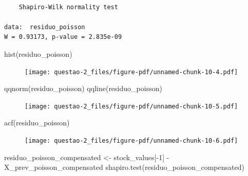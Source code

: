 \documentclass[
  letterpaper,
  DIV=11,
  numbers=noendperiod]{scrreprt}
\newenvironment{Shaded}{\begin{snugshade}}{\end{snugshade}}
\newcommand{\DecValTok}[1]{\textcolor[rgb]{0.68,0.00,0.00}{#1}}
\newcommand{\FunctionTok}[1]{\textcolor[rgb]{0.28,0.35,0.67}{#1}}
\newcommand{\NormalTok}[1]{\textcolor[rgb]{0.00,0.23,0.31}{#1}}
\newcommand{\OtherTok}[1]{\textcolor[rgb]{0.00,0.23,0.31}{#1}}
\newcommand{\SpecialCharTok}[1]{\textcolor[rgb]{0.37,0.37,0.37}{#1}}
\begin{document}
\begin{verbatim}

    Shapiro-Wilk normality test

data:  residuo_poisson
W = 0.93173, p-value = 2.835e-09
\end{verbatim}

\begin{Shaded}
\begin{Highlighting}[]
\FunctionTok{hist}\NormalTok{(residuo\_poisson)}
\end{Highlighting}
\end{Shaded}

\begin{figure}[H]

{\centering \texttt{[image: questao-2\_files/figure-pdf/unnamed-chunk-10-4.pdf]}

}

\end{figure}

\begin{Shaded}
\begin{Highlighting}[]
\FunctionTok{qqnorm}\NormalTok{(residuo\_poisson)}
\FunctionTok{qqline}\NormalTok{(residuo\_poisson)}
\end{Highlighting}
\end{Shaded}

\begin{figure}[H]

{\centering \texttt{[image: questao-2\_files/figure-pdf/unnamed-chunk-10-5.pdf]}

}

\end{figure}

\begin{Shaded}
\begin{Highlighting}[]
\FunctionTok{acf}\NormalTok{(residuo\_poisson)}
\end{Highlighting}
\end{Shaded}

\begin{figure}[H]

{\centering \texttt{[image: questao-2\_files/figure-pdf/unnamed-chunk-10-6.pdf]}

}

\end{figure}

\begin{Shaded}
\begin{Highlighting}[]
\NormalTok{residuo\_poisson\_compensated }\OtherTok{\textless{}{-}}\NormalTok{ stock\_values[}\SpecialCharTok{{-}}\DecValTok{1}\NormalTok{] }\SpecialCharTok{{-}}\NormalTok{ X\_prev\_poisson\_compensated}
\FunctionTok{shapiro.test}\NormalTok{(residuo\_poisson\_compensated)}
\end{Highlighting}
\end{Shaded}
\end{document}
